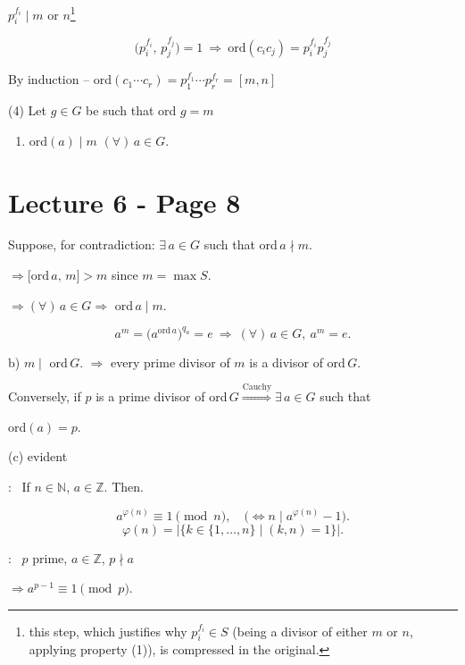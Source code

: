 \bigskip
\noindent $p_i^{f_i}\mid m$ or $n$\footnote{this step, which justifies why $p_i^{f_i}\in S$ (being a divisor of either $m$ or $n$, applying property (1)), is compressed in the original.}

\[
\big(p_i^{f_i},\,p_j^{f_j}\big)=1 \ \Rightarrow \ \text{ord}(c_ic_j) = p_i^{f_i}p_j^{f_j}
\]

\bigskip
\noindent By induction -- ord$(c_1\cdots c_r) = p_1^{f_1}\cdots p_r^{f_r} = [m,n]$

\bigskip
\noindent (4) Let $g\in G$ be such that ord $g=m$

\begin{enumerate}
\item[(a)] ord$(a)\mid m$ $(\forall)\,a\in G$.
\end{enumerate}



\section*{Lecture 6 - Page 8}

\noindent Suppose, for contradiction: $\exists\,a\in G$ such that ord$\,a\nmid m$.

\noindent $\Rightarrow \big[\text{ord}\,a,\,m\big] > m$ \quad since $m=\max S$.

\bigskip
\noindent $\Rightarrow (\forall)\,a\in G \Rightarrow$ ord$\,a\mid m$.

\[
a^m = \big(a^{\text{ord}\,a}\big)^{q_a} = e \ \Rightarrow \ (\forall)\,a\in G,\ a^m=e.
\]

\bigskip
\noindent b) $m\mid$ ord$\,G$. $\Rightarrow$ every prime divisor of $m$ is a divisor of ord$\,G$.

\noindent Conversely, if $p$ is a prime divisor of ord$\,G \overset{\text{Cauchy}}{\Longrightarrow} \exists\,a\in G$ such that

\noindent ord$(a)=p$.

\bigskip
\noindent (c) evident

\bigskip
\noindent{}: \ If $n\in\mathbb{N}$, $a\in\mathbb{Z}$. Then.

\[
a^{\varphi(n)} \equiv 1 \pmod n, \quad \big(\Leftrightarrow n\mid a^{\varphi(n)}-1\big).
\]
\[
\varphi(n) = \big|\{k\in\{1,\ldots,n\} \mid (k,n)=1\}\big|.
\]

\bigskip
\noindent{}: \ $p$ prime, $a\in\mathbb{Z}$, $p\nmid a$

\noindent $\Rightarrow a^{p-1}\equiv 1 \pmod p$.

